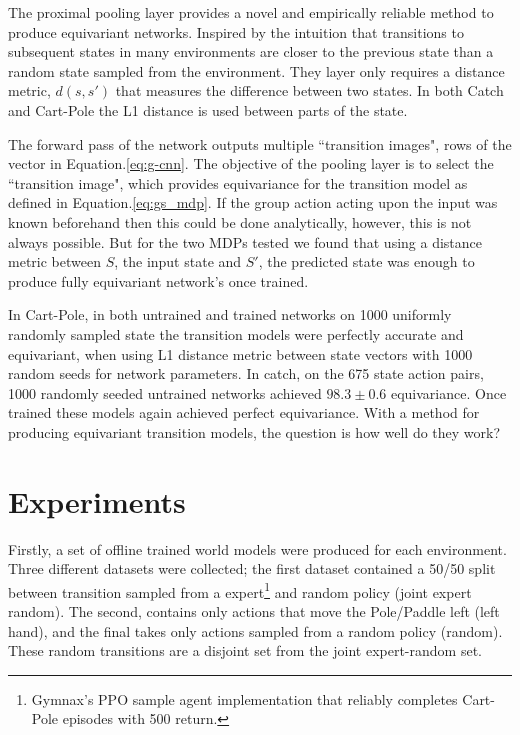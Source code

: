 \documentclass[mlabstract]{jmlr}
\begin{document}
The proximal pooling layer provides a novel and empirically reliable method to produce equivariant networks. Inspired by the intuition that transitions to subsequent states in many environments are closer to the previous state than a random state sampled from the environment. They layer only requires a distance metric, $d(s, s')$ that measures the difference between two states. In both Catch and Cart-Pole the L1 distance is used between parts of the state.

The forward pass of the network outputs multiple ``transition images", rows of the vector in Equation.\ref{eq:g-cnn}. The objective of the pooling layer is to select the ``transition image", which provides equivariance for the transition model as defined in Equation.\ref{eq:gs_mdp}. If the group action acting upon the input was known beforehand then this could be done analytically, however, this is not always possible. But for the two MDPs tested we found that using a distance metric between $S$, the input state and $S'$, the predicted state was enough to produce fully equivariant network's once trained.

In Cart-Pole, in both untrained and trained networks on 1000 uniformly randomly sampled state the transition models were perfectly accurate and equivariant, when using L1 distance metric between state vectors with 1000 random seeds for network parameters. In catch, on the 675 state action pairs, 1000 randomly seeded untrained networks achieved $98.3 \pm 0.6$ equivariance. Once trained these models again achieved perfect equivariance. With a method for producing equivariant transition models, the question is how well do they work?

\section{Experiments}
Firstly, a set of offline trained world models were produced for each environment. Three different datasets were collected; the first dataset contained a 50/50 split between transition sampled from a expert\footnote{Gymnax's PPO sample agent implementation that reliably completes Cart-Pole episodes with 500 return.} and random policy (joint expert random). The second, contains only actions that move the Pole/Paddle left (left hand), and the final takes only actions sampled from a random policy (random). These random transitions are a disjoint set from the joint expert-random set.
\end{document}
